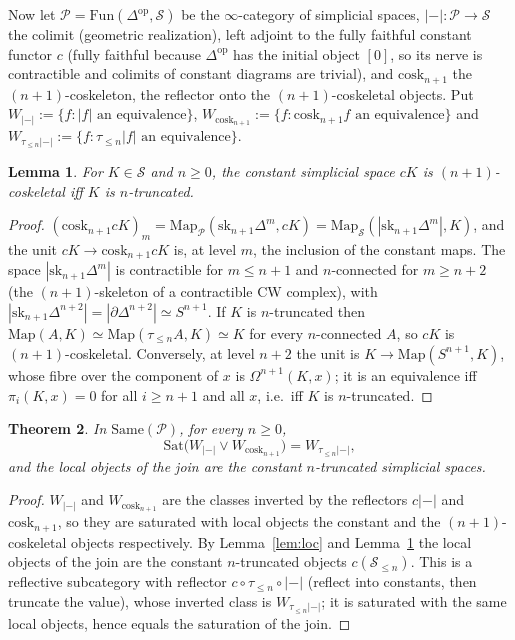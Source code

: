 \documentclass[11pt]{amsart}
\newtheorem{thm}{Theorem}[section]
\newtheorem{lem}[thm]{Lemma}
\theoremstyle{definition}
\newcommand{\Same}{\mathrm{Same}}
\newcommand{\Sat}{\mathrm{Sat}}
\begin{document}
Now let $\mathcal P=\mathrm{Fun}(\Delta^{\mathrm{op}},\mathcal S)$ be the
$\infty$-category of simplicial spaces, $|-|\colon\mathcal P\to\mathcal S$ the
colimit (geometric realization), left adjoint to the fully faithful constant
functor $c$ (fully faithful because $\Delta^{\mathrm{op}}$ has the initial object
$[0]$, so its nerve is contractible and colimits of constant diagrams are
trivial), and
$\mathrm{cosk}_{n+1}$ the $(n{+}1)$-coskeleton, the reflector onto the
$(n{+}1)$-coskeletal objects. Put $W_{|-|}:=\{f:|f|\text{ an equivalence}\}$,
$W_{\mathrm{cosk}_{n+1}}:=\{f:\mathrm{cosk}_{n+1}f\text{ an equivalence}\}$ and
$W_{\tau_{\le n}|-|}:=\{f:\tau_{\le n}|f|\text{ an equivalence}\}$.

\begin{lem}\label{lem:constcosk}
For $K\in\mathcal S$ and $n\ge0$, the constant simplicial space $cK$ is
$(n{+}1)$-coskeletal iff $K$ is $n$-truncated.
\end{lem}
\begin{proof}
$(\mathrm{cosk}_{n+1}cK)_m=\mathrm{Map}_{\mathcal P}(\mathrm{sk}_{n+1}\Delta^m,cK)
=\mathrm{Map}_{\mathcal S}(|\mathrm{sk}_{n+1}\Delta^m|,K)$, and the unit
$cK\to\mathrm{cosk}_{n+1}cK$ is, at level $m$, the inclusion of the constant
maps. The space $|\mathrm{sk}_{n+1}\Delta^m|$ is contractible for $m\le n+1$ and
$n$-connected for $m\ge n+2$ (the $(n{+}1)$-skeleton of a contractible CW
complex), with $|\mathrm{sk}_{n+1}\Delta^{n+2}|=|\partial\Delta^{n+2}|\simeq S^{n+1}$.
If $K$ is $n$-truncated then $\mathrm{Map}(A,K)\simeq\mathrm{Map}(\tau_{\le n}A,K)
\simeq K$ for every $n$-connected $A$, so $cK$ is $(n{+}1)$-coskeletal.
Conversely, at level $n+2$ the unit is $K\to\mathrm{Map}(S^{n+1},K)$, whose
fibre over the component of $x$ is $\Omega^{n+1}(K,x)$; it is an equivalence
iff $\pi_i(K,x)=0$ for all $i\ge n+1$ and all $x$, i.e.\ iff $K$ is
$n$-truncated.
\end{proof}

\begin{thm}\label{thm:sspace}
In $\Same(\mathcal P)$, for every $n\ge0$,
\[
\Sat\bigl(W_{|-|}\vee W_{\mathrm{cosk}_{n+1}}\bigr)=W_{\tau_{\le n}|-|},
\]
and the local objects of the join are the constant $n$-truncated simplicial
spaces.
\end{thm}
\begin{proof}
$W_{|-|}$ and $W_{\mathrm{cosk}_{n+1}}$ are the classes inverted by the reflectors
$c|-|$ and $\mathrm{cosk}_{n+1}$, so they are saturated with local objects the
constant and the $(n{+}1)$-coskeletal objects respectively. By
Lemma~\ref{lem:loc} and Lemma~\ref{lem:constcosk} the local objects of the join
are the constant $n$-truncated objects $c(\mathcal S_{\le n})$. This is a
reflective subcategory with reflector $c\circ\tau_{\le n}\circ|-|$ (reflect
into constants, then truncate the value), whose inverted class is
$W_{\tau_{\le n}|-|}$; it is saturated with the same local objects, hence equals
the saturation of the join.
\end{proof}
\end{document}

